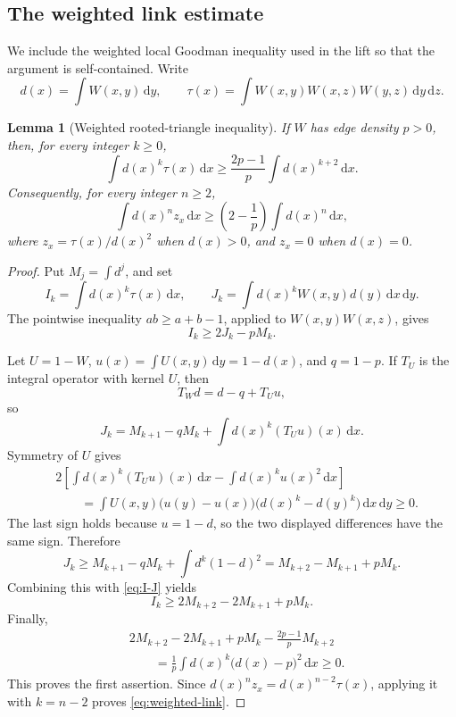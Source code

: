 \documentclass[11pt]{article}
\newtheorem{lemma}[theorem]{Lemma}
\newcommand{\dd}{\,\mathrm d}
\begin{document}
\subsection{The weighted link estimate}

We include the weighted local Goodman inequality used in the lift so that
the argument is self-contained.  Write
\[
 d(x)=\int W(x,y)\dd y,
 \qquad
 \tau(x)=\int W(x,y)W(x,z)W(y,z)\dd y\dd z.
\]

\begin{lemma}[Weighted rooted-triangle inequality]\label{lem:weighted-goodman}
If \(W\) has edge density \(p>0\), then, for every integer \(k\geq0\),
\[
 \int d(x)^k\tau(x)\dd x
 \geq
 \frac{2p-1}{p}\int d(x)^{k+2}\dd x.
\]
Consequently, for every integer \(n\geq2\),
\begin{equation}\label{eq:weighted-link}
 \int d(x)^n z_x\dd x
 \geq
 \left(2-\frac1p\right)\int d(x)^n\dd x,
\end{equation}
where \(z_x=\tau(x)/d(x)^2\) when \(d(x)>0\), and \(z_x=0\)
when \(d(x)=0\).
\end{lemma}

\begin{proof}
Put \(M_j=\int d^j\), and set
\[
 I_k=\int d(x)^k\tau(x)\dd x,
 \qquad
 J_k=\int d(x)^kW(x,y)d(y)\dd x\dd y.
\]
The pointwise inequality \(ab\geq a+b-1\), applied to
\(W(x,y)W(x,z)\), gives
\begin{equation}\label{eq:I-J}
 I_k\geq2J_k-pM_k.
\end{equation}

Let \(U=1-W\), \(u(x)=\int U(x,y)\dd y=1-d(x)\), and
\(q=1-p\).  If \(T_U\) is the integral operator with kernel \(U\), then
\[
 T_Wd=d-q+T_Uu,
\]
so
\[
 J_k=M_{k+1}-qM_k+\int d(x)^k(T_Uu)(x)\dd x.
\]
Symmetry of \(U\) gives
\[
\begin{split}
 &2\left[
 \int d(x)^k(T_Uu)(x)\dd x-\int d(x)^ku(x)^2\dd x
 \right]\\
 &\qquad=
 \int U(x,y)\bigl(u(y)-u(x)\bigr)
 \bigl(d(x)^k-d(y)^k\bigr)\dd x\dd y
 \geq0.
\end{split}
\]
The last sign holds because \(u=1-d\), so the two displayed differences
have the same sign.  Therefore
\[
 J_k\geq
 M_{k+1}-qM_k+\int d^k(1-d)^2
 =M_{k+2}-M_{k+1}+pM_k.
\]
Combining this with \eqref{eq:I-J} yields
\[
 I_k\geq2M_{k+2}-2M_{k+1}+pM_k.
\]
Finally,
\[
\begin{split}
 &2M_{k+2}-2M_{k+1}+pM_k
 -\frac{2p-1}{p}M_{k+2}\\
 &\qquad=
 \frac1p\int d(x)^k\bigl(d(x)-p\bigr)^2\dd x
 \geq0.
\end{split}
\]
This proves the first assertion.  Since
\(d(x)^nz_x=d(x)^{n-2}\tau(x)\), applying it with \(k=n-2\)
proves \eqref{eq:weighted-link}.
\end{proof}
\end{document}
